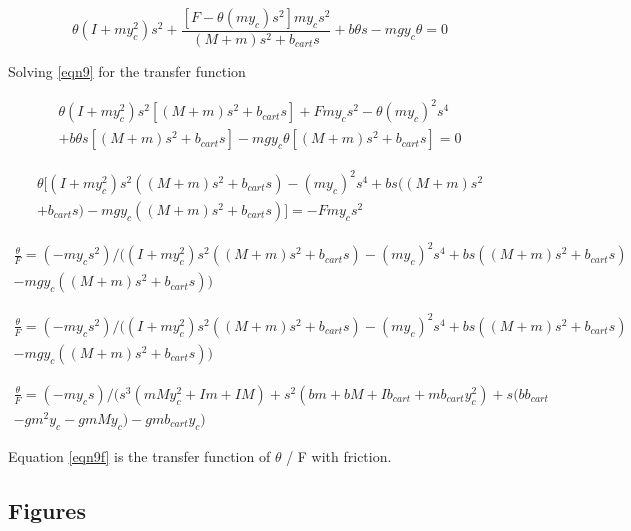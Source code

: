 \documentclass{article}
\begin{document}
\begin{equation} 
\label{eqn9}
\theta (I+m y_c^2) s^2+  \frac{[F - \theta(m y_c) s^2] m y_c s^2}{(M+m) s^2 + b_{cart} s}+b \theta s - m g y_c \theta = 0 
\end{equation}

Solving \ref{eqn9} for the transfer function

\begin{multline} 
\label{eqn9b}
\theta (I+m y_c^2) s^2 [(M+m) s^2 + b_{cart} s]+ F m y_c s^2 - \theta(m y_c)^2 s^4 \\ 
+ b \theta s [(M+m) s^2 + b_{cart} s]- m g y_c \theta [(M+m) s^2 + b_{cart} s]= 0 
\end{multline}

\begin{multline} 
\label{eqn9c}
\theta [(I+m y_c^2) s^2 ((M+m) s^2 + b_{cart} s) - (m y_c)^2 s^4 + b s ((M+m) s^2 \\+ b_{cart} s)
- m g y_c ((M+m) s^2 + b_{cart} s)] = -F m y_c s^2
\end{multline}

\begin{multline} 
\label{eqn9d}
\frac{\theta}{F} = (-m y_c s^2)/((I+m y_c^2) s^2 ((M+m) s^2 + b_{cart} s) - (m y_c)^2 s^4 + b s ((M+m) s^2 + b_{cart} s) \\
- m g y_c ((M+m) s^2 + b_{cart} s))
\end{multline}

\begin{multline} 
\label{eqn9e}
\frac{\theta}{F} = (-m y_c s^2)/((I+m y_c^2) s^2 ((M+m) s^2 + b_{cart} s) - (m y_c)^2 s^4 + b s ((M+m) s^2 + b_{cart} s) \\
- m g y_c ((M+m) s^2 + b_{cart} s))
\end{multline}

\begin{multline} 
\label{eqn9f}
\frac{\theta}{F} = (-m y_c s)/(s^3(m M y_c^2 + I m + I M) + s^2(b m + b M + I b_{cart} + m b_{cart} y_c^2) + s(b b_{cart} \\
- g m^2  y_c - g m M y_c) - g m b_{cart} y_c)
\end{multline}

Equation \ref{eqn9f} is the transfer function of $\theta$ / F with friction.



\subsection{Figures}
\end{document}
